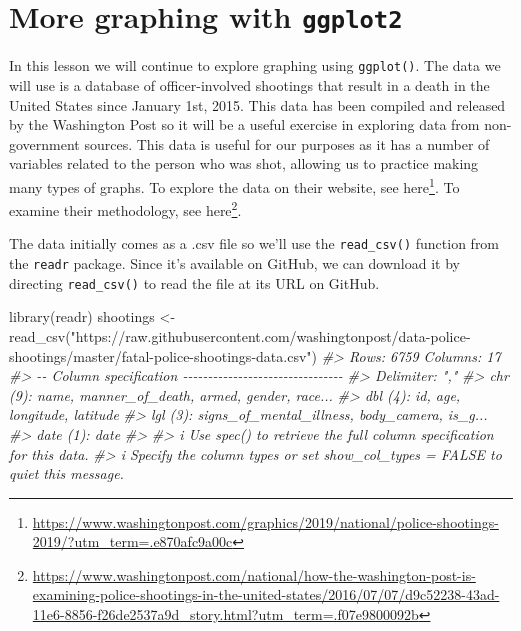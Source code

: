 \documentclass[
]{krantz}
\makeatletter
\newenvironment{Shaded}{\begin{snugshade}}{\end{snugshade}}
\newcommand{\CommentTok}[1]{\textcolor[rgb]{0.37,0.37,0.37}{\textit{#1}}}
\newcommand{\FunctionTok}[1]{\textcolor[rgb]{0,0,0}{#1}}
\newcommand{\NormalTok}[1]{#1}
\newcommand{\OtherTok}[1]{\textcolor[rgb]{0.37,0.37,0.37}{#1}}
\newcommand{\StringTok}[1]{\textcolor[rgb]{0.5,0.5,0.5}{#1}}
\renewcommand{\href}[2]{#2\footnote{\url{#1}}}
\newenvironment{kframe}{%
\medskip{}
\setlength{\fboxsep}{.8em}
 \def\at@end@of@kframe{}%
 \ifinner\ifhmode%
  \def\at@end@of@kframe{\end{minipage}}%
  \begin{minipage}{\columnwidth}%
 \fi\fi%
 \def\FrameCommand##1{\hskip\@totalleftmargin \hskip-\fboxsep
 \colorbox{shadecolor}{##1}\hskip-\fboxsep
     \hskip-\linewidth \hskip-\@totalleftmargin \hskip\columnwidth}%
 \MakeFramed {\advance\hsize-\width
   \@totalleftmargin\z@ \linewidth\hsize
   \@setminipage}}%
 {\par\unskip\endMakeFramed%
 \at@end@of@kframe}
\renewenvironment{Shaded}{\begin{kframe}}{\end{kframe}}
\makeatother
\begin{document}
\hypertarget{ois_graphs}{%
\chapter{\texorpdfstring{More graphing with \texttt{ggplot2}}{More graphing with ggplot2}}\label{ois_graphs}}

In this lesson we will continue to explore graphing using \texttt{ggplot()}. The data we will use is a database of officer-involved shootings that result in a death in the United States since January 1st, 2015. This data has been compiled and released by the Washington Post so it will be a useful exercise in exploring data from non-government sources. This data is useful for our purposes as it has a number of variables related to the person who was shot, allowing us to practice making many types of graphs.
To explore the data on their website, see \href{https://www.washingtonpost.com/graphics/2019/national/police-shootings-2019/?utm_term=.e870afc9a00c}{here}.
To examine their methodology, see \href{https://www.washingtonpost.com/national/how-the-washington-post-is-examining-police-shootings-in-the-united-states/2016/07/07/d9c52238-43ad-11e6-8856-f26de2537a9d_story.html?utm_term=.f07e9800092b}{here}.

The data initially comes as a .csv file so we'll use the \texttt{read\_csv()} function from the \texttt{readr} package. Since it's available on GitHub, we can download it by directing \texttt{read\_csv()} to read the file at its URL on GitHub.

\begin{Shaded}
\begin{Highlighting}[]
\FunctionTok{library}\NormalTok{(readr)}
\NormalTok{shootings }\OtherTok{\textless{}{-}} \FunctionTok{read\_csv}\NormalTok{(}\StringTok{"https://raw.githubusercontent.com/washingtonpost/data{-}police{-}shootings/master/fatal{-}police{-}shootings{-}data.csv"}\NormalTok{)}
\CommentTok{\#\textgreater{} Rows: 6759 Columns: 17}
\CommentTok{\#\textgreater{} {-}{-} Column specification {-}{-}{-}{-}{-}{-}{-}{-}{-}{-}{-}{-}{-}{-}{-}{-}{-}{-}{-}{-}{-}{-}{-}{-}{-}{-}{-}{-}{-}{-}{-}{-}}
\CommentTok{\#\textgreater{} Delimiter: ","}
\CommentTok{\#\textgreater{} chr  (9): name, manner\_of\_death, armed, gender, race...}
\CommentTok{\#\textgreater{} dbl  (4): id, age, longitude, latitude}
\CommentTok{\#\textgreater{} lgl  (3): signs\_of\_mental\_illness, body\_camera, is\_g...}
\CommentTok{\#\textgreater{} date (1): date}
\CommentTok{\#\textgreater{} }
\CommentTok{\#\textgreater{} i Use \textasciigrave{}spec()\textasciigrave{} to retrieve the full column specification for this data.}
\CommentTok{\#\textgreater{} i Specify the column types or set \textasciigrave{}show\_col\_types = FALSE\textasciigrave{} to quiet this message.}
\end{Highlighting}
\end{Shaded}
\end{document}
